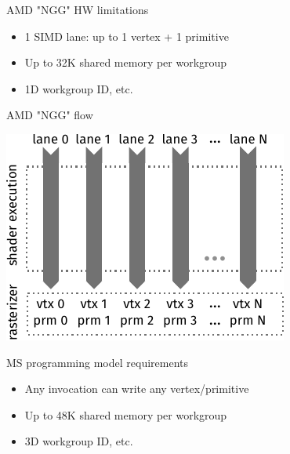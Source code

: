 \documentclass[aspectratio=169,t,xcolor=table]{beamer}
\begin{document}
\begin{frame}{AMD "NGG" HW limitations}

    \LARGE

    \begin{itemize}
      	\item 1 SIMD lane: up to 1 vertex + 1 primitive
      	\item Up to 32K shared memory per workgroup
      	\item 1D workgroup ID, etc.
    \end{itemize}

\end{frame}

\begin{frame}{AMD "NGG" flow}

    \LARGE

    \begin{center}
        \includegraphics{figs/ms_ngg.svg.pdf}
    \end{center}

\end{frame}

\begin{frame}{MS programming model requirements}

    \LARGE

    \begin{itemize}
      	\item Any invocation can write any vertex/primitive
      	\item Up to 48K shared memory per workgroup
      	\item 3D workgroup ID, etc.
    \end{itemize}

\end{frame}
\end{document}

